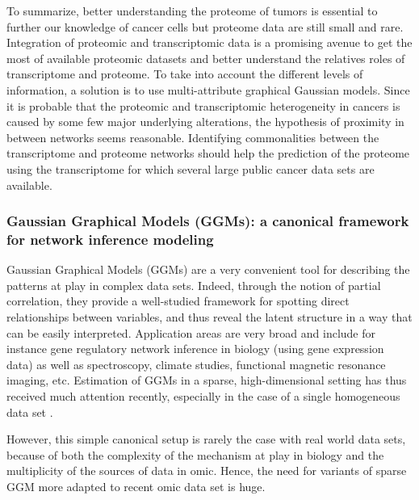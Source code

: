 To summarize, better understanding the proteome of tumors is essential
to further our knowledge of cancer cells but proteome data are still
small and rare.  Integration of proteomic and transcriptomic data is a
promising avenue to get the most of available proteomic datasets and
better understand the relatives roles of transcriptome and proteome.
To take into account the different levels of information, a solution
is to use multi-attribute graphical Gaussian models. Since it is
probable that the proteomic and transcriptomic heterogeneity in
cancers is caused by some few major underlying alterations, the
hypothesis of proximity in between networks seems reasonable.
Identifying commonalities between the transcriptome and proteome
networks should help the prediction of the proteome using the
transcriptome for which several large public cancer data sets are
available.

\subsubsection*{Gaussian Graphical Models (GGMs): a canonical framework
  for network inference modeling}

Gaussian Graphical Models (GGMs)
\cite{1996_Book_Lauritzen,whittaker1990graphical} are a very
convenient tool for describing the patterns at play in complex data
sets.  Indeed, through the notion of partial correlation, they provide
a well-studied framework for spotting direct relationships between
variables, and thus reveal the latent structure in a way that can be
easily interpreted. Application areas are very broad and include for
instance gene regulatory network inference in biology (using gene
expression data) as well as spectroscopy, climate studies, functional
magnetic resonance imaging, etc.  Estimation of GGMs in a sparse,
high-dimensional setting has thus received much attention recently,
especially in the case of a single homogeneous data set
\citep{2006_AS_Meinshausen,2007_BS_Friedman,2008_JMLR_Banerjee,2010_JMLR_Yuan,2011_AS_Cai}.

However, this simple canonical setup is rarely the case with real
world data sets, because of both the complexity of the mechanism at
play in biology and the multiplicity of the sources of data in
omic. Hence, the need for variants of sparse GGM more adapted to
recent omic data set is huge.

